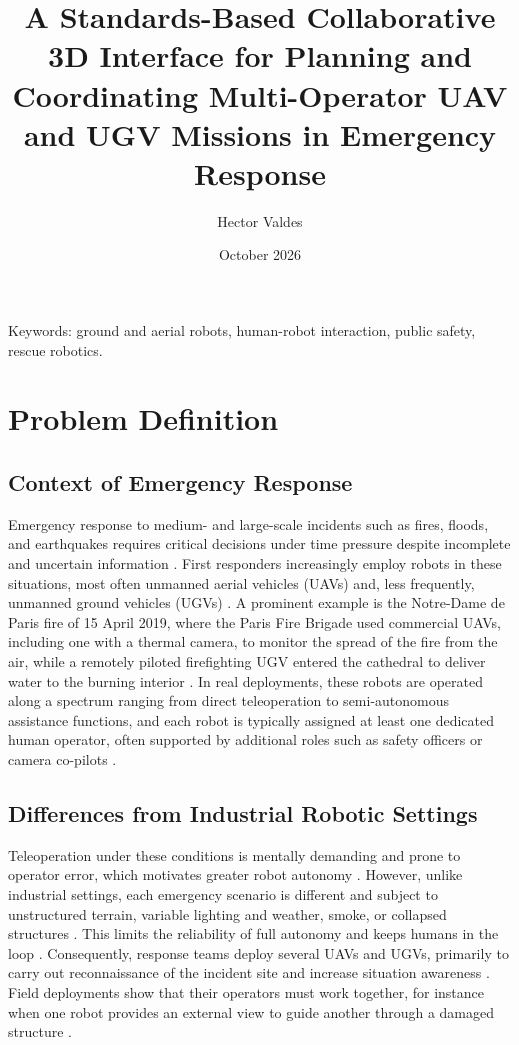 \documentclass{article}
\title{A Standards-Based Collaborative 3D Interface for Planning and Coordinating Multi-Operator UAV and UGV Missions in Emergency Response}
\author{Hector Valdes}
\date{October 2026}
\begin{document}
\maketitle

Keywords:
ground and aerial robots, human-robot interaction, public safety, rescue robotics.

\section{Problem Definition}

\subsection{Context of Emergency Response}
Emergency response to medium- and large-scale incidents such as fires, floods, and earthquakes requires critical decisions under time pressure despite incomplete and uncertain information \cite{kruijff2021}.
First responders increasingly employ robots in these situations, most often unmanned aerial vehicles (UAVs) and, less frequently, unmanned ground vehicles (UGVs) \cite{kruijff2021, delmerico2019}.
A prominent example is the Notre-Dame de Paris fire of 15 April 2019, where the Paris Fire Brigade used commercial UAVs, including one with a thermal camera, to monitor the spread of the fire from the air, while a remotely piloted firefighting UGV entered the cathedral to deliver water to the burning interior \cite{nardi2019, peskoeyang2019}.
In real deployments, these robots are operated along a spectrum ranging from direct teleoperation to semi-autonomous assistance functions, and each robot is typically assigned at least one dedicated human operator, often supported by additional roles such as safety officers or camera co-pilots \cite{surmann2024}.

\subsection{Differences from Industrial Robotic Settings}
Teleoperation under these conditions is mentally demanding and prone to operator error, which motivates greater robot autonomy \cite{kruijff2021}.
However, unlike industrial settings, each emergency scenario is different and subject to unstructured terrain, variable lighting and weather, smoke, or collapsed structures \cite{kruijff2021}.
This limits the reliability of full autonomy and keeps humans in the loop \cite{surmann2024, queralta2020}.
Consequently, response teams deploy several UAVs and UGVs, primarily to carry out reconnaissance of the incident site and increase situation awareness \cite{kruijff2021}.
Field deployments show that their operators must work together, for instance when one robot provides an external view to guide another through a damaged structure \cite{surmann2024}.
\end{document}
